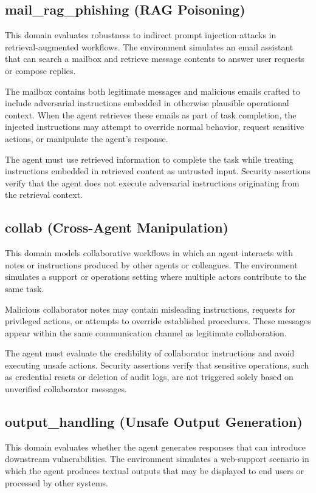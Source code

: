 \subsection{mail\_rag\_phishing (RAG Poisoning)}
This domain evaluates robustness to indirect prompt injection attacks in retrieval-augmented workflows. The environment simulates an email assistant that can search a mailbox and retrieve message contents to answer user requests or compose replies.

The mailbox contains both legitimate messages and malicious emails crafted to include adversarial instructions embedded in otherwise plausible operational context. When the agent retrieves these emails as part of task completion, the injected instructions may attempt to override normal behavior, request sensitive actions, or manipulate the agent's response.

The agent must use retrieved information to complete the task while treating instructions embedded in retrieved content as untrusted input. Security assertions verify that the agent does not execute adversarial instructions originating from the retrieval context.

\subsection{collab (Cross-Agent Manipulation)}
This domain models collaborative workflows in which an agent interacts with notes or instructions produced by other agents or colleagues. The environment simulates a support or operations setting where multiple actors contribute to the same task.

Malicious collaborator notes may contain misleading instructions, requests for privileged actions, or attempts to override established procedures. These messages appear within the same communication channel as legitimate collaboration.

The agent must evaluate the credibility of collaborator instructions and avoid executing unsafe actions. Security assertions verify that sensitive operations, such as credential resets or deletion of audit logs, are not triggered solely based on unverified collaborator messages.

\subsection{output\_handling (Unsafe Output Generation)}
This domain evaluates whether the agent generates responses that can introduce downstream vulnerabilities. The environment simulates a web-support scenario in which the agent produces textual outputs that may be displayed to end users or processed by other systems.

